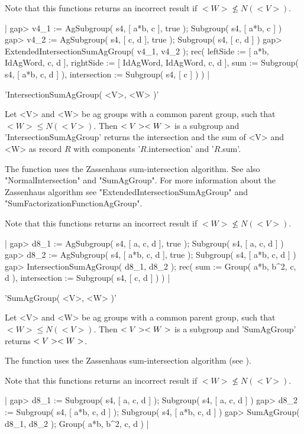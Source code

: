 Note  that this functions returns  an incorrect result  if $<W> \not \leq
N(<V>)$.

|    gap> v4_1 := AgSubgroup( s4, [ a*b, c ], true );
    Subgroup( s4, [ a*b, c ] )
    gap> v4_2 := AgSubgroup( s4, [ c, d ], true );
    Subgroup( s4, [ c, d ] )
    gap> ExtendedIntersectionSumAgGroup( v4_1, v4_2 );
    rec(
      leftSide := [ a*b, IdAgWord, c, d ],
      rightSide := [ IdAgWord, IdAgWord, c, d ],
      sum := Subgroup( s4, [ a*b, c, d ] ),
      intersection := Subgroup( s4, [ c ] ) ) |


'IntersectionSumAgGroup( <V>, <W> )'

Let <V> and <W> be  ag groups with a  common parent group, such that $<W>
\leq   N    (<V>)$.    Then  $<V>      \* <W>$   is     a  subgroup   and
'IntersectionSumAgGroup' returns the intersection and the  sum of <V> and
<W> as record $R$ with components '$R$.intersection' and '$R$.sum'.

The function  uses the Zassenhaus  sum-intersection algorithm.   See also
"NormalIntersection" and "SumAgGroup".   For more  information  about the
Zassenhaus    algorithm     see    "ExtendedIntersectionSumAgGroup"   and
"SumFactorizationFunctionAgGroup".

Note that this  functions returns an  incorrect result if $<W> \not  \leq
N(<V>)$.

|    gap> d8_1 := AgSubgroup( s4, [ a, c, d ], true );
    Subgroup( s4, [ a, c, d ] )
    gap> d8_2 := AgSubgroup( s4, [ a*b, c, d ], true );
    Subgroup( s4, [ a*b, c, d ] )
    gap> IntersectionSumAgGroup( d8_1, d8_2 );
    rec(
      sum := Group( a*b, b^2, c, d ),
      intersection := Subgroup( s4, [ c, d ] ) ) |


'SumAgGroup( <V>, <W> )'

Let <V> and <W> be ag groups  with a common parent  group, such that $<W>
\leq N (<V>)$.  Then $<V> \* <W>$ is  a subgroup and 'SumAgGroup' returns
$<V> \* <W>$.

The   function  uses  the   Zassenhaus sum-intersection   algorithm  (see
\cite{GS90}).

Note that this  functions returns an  incorrect result if  $<W> \not \leq
N(<V>)$.

|    gap> d8_1 := Subgroup( s4, [ a, c, d ] );
    Subgroup( s4, [ a, c, d ] )
    gap> d8_2 := Subgroup( s4, [ a*b, c, d ] );
    Subgroup( s4, [ a*b, c, d ] )
    gap> SumAgGroup( d8_1, d8_2 );
    Group( a*b, b^2, c, d ) |

